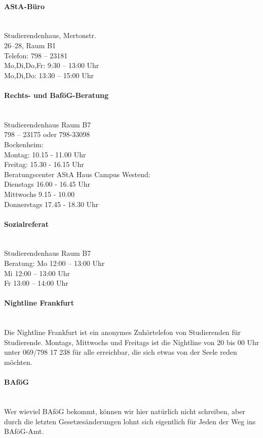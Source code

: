 \paragraph{AStA-Büro}~\\
Studierendenhaus, Mertonstr.\\
26–28, Raum B1\\
Telefon: 798 – 23181\\
Mo,Di,Do,Fr: 9:30 -- 13:00 Uhr\\
Mo,Di,Do: 13:30 -- 15:00 Uhr


\paragraph{Rechts- und BaföG-Beratung}~\\
Studierendenhaus Raum B7\\
798 – 23175 oder 798-33098\\
Bockenheim:\\
Montag: 10.15 - 11.00 Uhr \\  
Freitag: 15.30 - 16.15 Uhr \\
Beratungscenter AStA Haus Campus Westend:\\
Dienstags 16.00 - 16.45 Uhr \\
Mittwochs 9.15 - 10.00 \\
Donnerstags 17.45 - 18.30 Uhr \\

\paragraph{Sozialreferat}~\\
Studierendenhaus Raum B7\\
Beratung: Mo 12:00 -- 13:00 Uhr\\
Mi 12:00 -- 13:00 Uhr\\
Fr 13:00 -- 14:00 Uhr

\paragraph{Nightline Frankfurt}~\\
Die Nightline Frankfurt ist ein anonymes Zuhörtelefon von Studierenden für Studierende.
Montags, Mittwochs und Freitags ist die Nightline von 20 bis 00 Uhr unter 069/798 17 238 für alle erreichbar, die sich etwas von der Seele reden möchten. 


\paragraph{BAföG}~\\
Wer wieviel BAföG bekommt, können wir hier natürlich nicht schreiben, aber durch die letzten Gesetzesänderungen lohnt sich eigentlich für Jeden der Weg ins BAföG-Amt.

